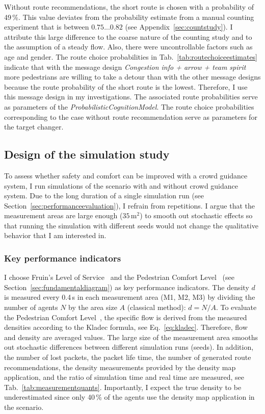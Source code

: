 Without route recommendations, the short route is chosen with a probability of 49\,\%. This value deviates from the probability estimate from a manual counting experiment that is between $0.75 ... 0.82$ (see Appendix~\ref{sec:countstudy}). I attribute this large difference to the coarse nature of the counting study and to the assumption of a steady flow. Also, there were uncontrollable factors such as age and gender. The route choice probabilities in Tab.~\ref{tab:routechoiceestimates} indicate that with the
 message design \textit{Congestion info + arrow + team spirit} more pedestrians are willing to take a detour than with the other message designs because the route probability of the short route is the lowest. Therefore, I use this message design in my investigations. The associated route probabilities serve as parameters of the \textit{ProbabilisticCognitionModel}. The route choice probabilities corresponding to the case without route recommendation serve as parameters for the target changer.



\FloatBarrier
\subsection{Design of the simulation study}

To assess whether safety and comfort can be improved with a crowd guidance system, I run simulations of the scenario with and without crowd guidance system. Due to the long duration of a single simulation run (see Section~\ref{sec:performanceevaluation}), I refrain from repetitions.
I argue that the measurement areas are large enough ($35\,\text{m}^2$) to smooth out stochastic effects so that running the simulation with different seeds would not change the qualitative behavior that I am interested in.


\subsubsection{Key performance indicators}
I choose Fruin's Level of Service~\cite{fruin-1971-cdyn} and the Pedestrian Comfort Level~\cite{tfl-2019-cdyn} (see Section~\ref{sec:fundamentaldiagram}) as key performance indicators. The density $d$ is measured every 0.4\,s in each measurement area (M1, M2, M3) by dividing the number of agents $N$ by the area size $A$ (classical method): $d = N / A$.
To evaluate the Pedestrian Comfort Level~\cite{tfl-2019-cdyn}, the specific flow is derived from the measured densities according to the Kladec formula, see Eq.~\eqref{eq:kladec}. Therefore, flow and density are averaged values. The large size of the measurement area smooths out stochastic differences between different simulation runs (seeds). 
In addition, the number of lost packets, the packet life time, the number of generated route recommendations, the density measurements provided by the density map application, and the ratio of simulation time and real time are measured, see Tab.~\ref{tab:measurementquants}. Importantly, I expect the true density to be underestimated since only 40\,\% of the agents use the density map application in the scenario. 

